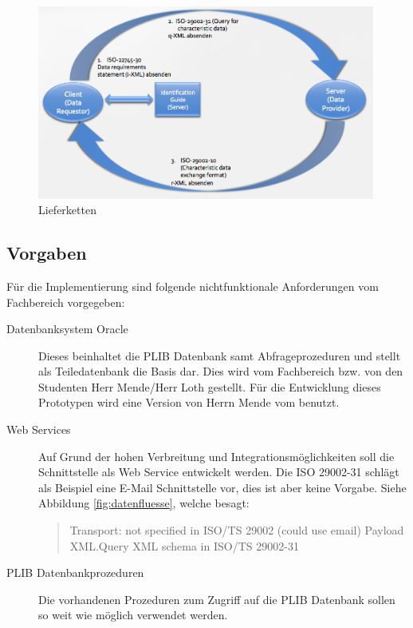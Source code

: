 \begin{figure}[htbp]
	\centering
		\includegraphics[width=0.99\textwidth]{images/lieferketten_plib.png}
		\caption[Lieferketten]{Lieferketten\footnotemark}
	\label{fig:lieferketten}
\end{figure}

\subsection{Vorgaben}

Für die Implementierung sind folgende nichtfunktionale Anforderungen vom Fachbereich vorgegeben:
\begin{description}
\item[Datenbanksystem Oracle] Dieses beinhaltet die PLIB Datenbank samt Abfrageprozeduren und stellt als Teiledatenbank die Basis dar. Dies wird vom Fachbereich bzw. von den Studenten Herr Mende/Herr Loth gestellt. Für die Entwicklung dieses Prototypen wird eine Version von Herrn Mende vom  benutzt.  
\item[Web Services] Auf Grund der hohen Verbreitung und Integrationsmöglichkeiten soll die Schnittstelle als Web Service entwickelt werden. Die ISO 29002-31 schlägt als Beispiel eine E-Mail Schnittstelle vor, dies ist aber keine Vorgabe. Siehe Abbildung \autoref{fig:datenfluesse}, welche besagt:
\begin{quotation}
Transport: not specified in ISO/TS 29002 (could use email) Payload XML.Query XML schema in ISO/TS 29002-31
\end{quotation}
\item[PLIB Datenbankprozeduren] Die vorhandenen Prozeduren zum Zugriff auf die PLIB Datenbank sollen so weit wie möglich verwendet werden. 
\end{description}

